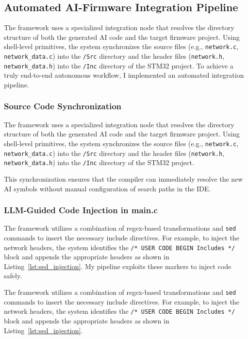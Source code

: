 \subsection{Automated AI-Firmware Integration Pipeline}

The framework uses a specialized integration node that resolves the directory structure of both the generated AI code and the target firmware project. Using shell-level primitives, the system synchronizes the source files (e.g., \texttt{network.c}, \texttt{network\_data.c}) into the \texttt{/Src} directory and the header files (\texttt{network.h}, \texttt{network\_data.h}) into the \texttt{/Inc} directory of the STM32 project. To achieve a truly end-to-end autonomous workflow, I implemented an automated integration pipeline.

\subsubsection{Source Code Synchronization}

The framework uses a specialized integration node that resolves the directory structure of both the generated AI code and the target firmware project. Using shell-level primitives, the system synchronizes the source files (e.g., \texttt{network.c}, \texttt{network\_data.c}) into the \texttt{/Src} directory and the header files (\texttt{network.h}, \texttt{network\_data.h}) into the \texttt{/Inc} directory of the STM32 project.

This synchronization ensures that the compiler can immediately resolve the new AI symbols without manual configuration of search paths in the IDE.

\subsubsection{LLM-Guided Code Injection in main.c}

The framework utilizes a combination of regex-based transformations and \texttt{sed} commands to insert the necessary include directives. For example, to inject the network headers, the system identifies the \texttt{/* USER CODE BEGIN Includes */} block and appends the appropriate headers as shown in Listing~\ref{lst:sed_injection}. My pipeline exploits these markers to inject code safely.

The framework utilizes a combination of regex-based transformations and \texttt{sed} commands to insert the necessary include directives. For example, to inject the network headers, the system identifies the \texttt{/* USER CODE BEGIN Includes */} block and appends the appropriate headers as shown in Listing~\ref{lst:sed_injection}.

